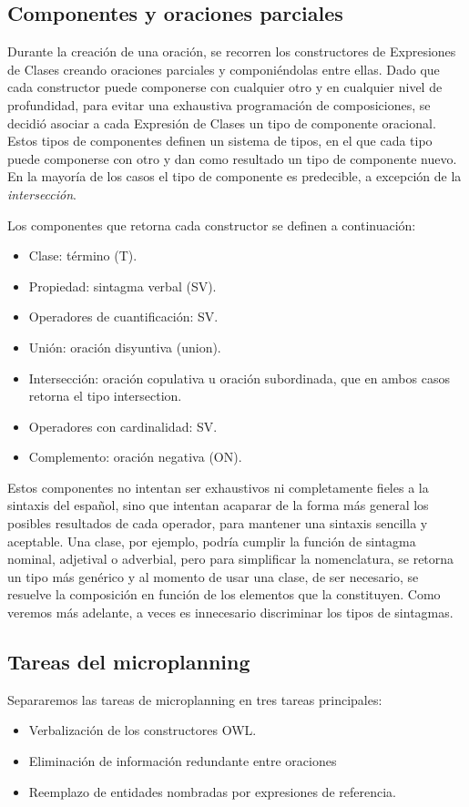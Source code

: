 \subsection{Componentes y oraciones parciales}
Durante la creación de una oración, se recorren los constructores de Expresiones de Clases creando oraciones parciales y componiéndolas entre ellas. Dado que cada constructor puede componerse con cualquier otro y en cualquier nivel de profundidad, para evitar una exhaustiva programación de composiciones, se decidió asociar a cada Expresión de Clases un tipo de componente oracional. Estos tipos de componentes definen un sistema de tipos, en el que cada tipo puede componerse con otro y dan como resultado un tipo de componente nuevo. En la mayoría de los casos el tipo de componente es predecible, a excepción de la \emph{intersección}.

Los componentes que retorna cada constructor se definen a continuación:
\begin{itemize}
    \item Clase: término (T).
    \item Propiedad: sintagma verbal (SV).
    \item Operadores de cuantificación: SV.
    \item Unión: oración disyuntiva (union).
    \item Intersección: oración copulativa u oración subordinada, que en ambos casos retorna el tipo intersection.%
    \item Operadores con cardinalidad: SV.
    \item Complemento: oración negativa (ON).
\end{itemize}

Estos componentes no intentan ser exhaustivos ni completamente fieles a la sintaxis del español, sino que intentan acaparar de la forma más general los posibles resultados de cada operador, para mantener una sintaxis sencilla y aceptable. Una clase, por ejemplo, podría cumplir la función de sintagma nominal, adjetival o adverbial, pero para simplificar la nomenclatura, se retorna un tipo más genérico y al momento de usar una clase, de ser necesario, se resuelve la composición en función de los elementos que la constituyen. Como veremos más adelante, a veces es innecesario discriminar los tipos de sintagmas.

\subsection{Tareas del microplanning}
Separaremos las tareas de microplanning en tres tareas principales: 
\begin{itemize}
    \item Verbalización de los constructores OWL.
    \item Eliminación de información redundante entre oraciones
    \item Reemplazo de entidades nombradas por expresiones de referencia.
\end{itemize}


